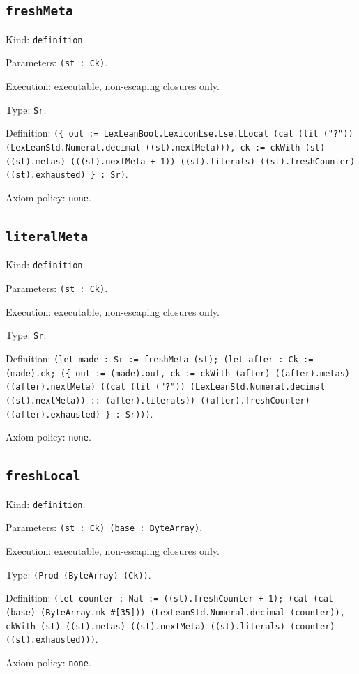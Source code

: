 \documentclass[11pt]{article}
\begin{document}
\subsection*{\texttt{freshMeta}}
\noindent Kind: \texttt{definition}.\par
\noindent Parameters: \texttt{(st : Ck)}.\par
\noindent Execution: executable, non-escaping closures only.\par
\noindent Type: \texttt{Sr}.\par
\noindent Definition: \texttt{(\{ out := LexLeanBoot.LexiconLse.Lse.LLocal (cat (lit ("?")) (LexLeanStd.Numeral.decimal ((st).nextMeta))), ck := ckWith (st) ((st).metas) (((st).nextMeta + 1)) ((st).literals) ((st).freshCounter) ((st).exhausted) \} : Sr)}.\par
\noindent Axiom policy: \texttt{none}.\par
\subsection*{\texttt{literalMeta}}
\noindent Kind: \texttt{definition}.\par
\noindent Parameters: \texttt{(st : Ck)}.\par
\noindent Execution: executable, non-escaping closures only.\par
\noindent Type: \texttt{Sr}.\par
\noindent Definition: \texttt{(let made : Sr := freshMeta (st); (let after : Ck := (made).ck; (\{ out := (made).out, ck := ckWith (after) ((after).metas) ((after).nextMeta) ((cat (lit ("?")) (LexLeanStd.Numeral.decimal ((st).nextMeta)) :: (after).literals)) ((after).freshCounter) ((after).exhausted) \} : Sr)))}.\par
\noindent Axiom policy: \texttt{none}.\par
\subsection*{\texttt{freshLocal}}
\noindent Kind: \texttt{definition}.\par
\noindent Parameters: \texttt{(st : Ck) (base : ByteArray)}.\par
\noindent Execution: executable, non-escaping closures only.\par
\noindent Type: \texttt{(Prod (ByteArray) (Ck))}.\par
\noindent Definition: \texttt{(let counter : Nat := ((st).freshCounter + 1); (cat (cat (base) (ByteArray.mk \#[35])) (LexLeanStd.Numeral.decimal (counter)), ckWith (st) ((st).metas) ((st).nextMeta) ((st).literals) (counter) ((st).exhausted)))}.\par
\noindent Axiom policy: \texttt{none}.\par
\end{document}
